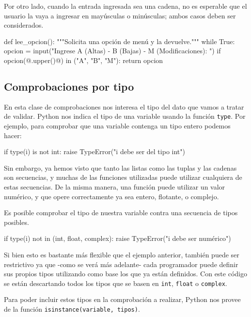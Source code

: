 Por otro lado, cuando la entrada ingresada sea una cadena, no es esperable que
el usuario la vaya a ingresar en mayúsculas o minúsculas; ambos casos deben
ser considerados.

\begin{codigo-python-sn}
def lee_opcion():
    """Solicita una opción de menú y la devuelve."""
    while True:
        opcion = input("Ingrese A (Altas) - B (Bajas) - M (Modificaciones): ")
        if opcion(@.upper()@) in ("A", "B", "M"):
            return opcion
\end{codigo-python-sn}

\subsection{Comprobaciones por tipo}

En esta clase de comprobaciones nos interesa el tipo del dato que vamos a
tratar de validar. Python nos indica el tipo de una variable usando la
función \lstinline!type!. Por ejemplo, para comprobar que una
variable contenga un tipo entero podemos hacer:

\begin{codigo-python-sn}
if type(i) is not int:
    raise TypeError("i debe ser del tipo int")
\end{codigo-python-sn}

Sin embargo, ya hemos visto que tanto las listas como las tuplas y las
cadenas son secuencias, y muchas de las funciones utilizadas puede utilizar
cualquiera de estas secuencias. De la misma manera, una función puede
utilizar un valor numérico, y que opere correctamente ya sea entero,
flotante, o complejo.

Es posible comprobar el tipo de nuestra variable contra una secuencia de
tipos posibles.

\begin{codigo-python-sn}
if type(i) not in (int, float, complex):
    raise TypeError("i debe ser numérico")
\end{codigo-python-sn}

Si bien esto es bastante más flexible que el ejemplo anterior, también puede
ser restrictivo ya que -como se verá más adelante- cada programador puede
definir sus propios tipos utilizando como base los que ya están definidos.
Con este código se están descartando todos los tipos que se basen en
\lstinline!int!, \lstinline!float! o \lstinline!complex!.

Para poder incluir estos tipos en la comprobación a realizar, Python nos
provee de la función \lstinline!isinstance(variable, tipos)!.

